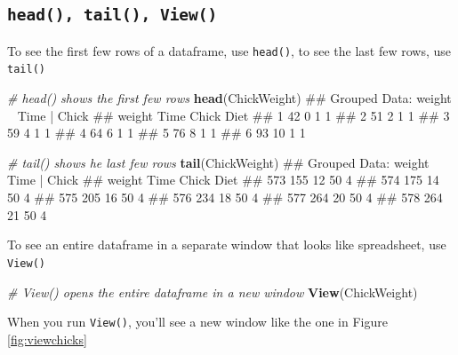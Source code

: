 \documentclass[]{book}
\newenvironment{Shaded}{\begin{snugshade}}{\end{snugshade}}
\newcommand{\KeywordTok}[1]{\textcolor[rgb]{0.13,0.29,0.53}{\textbf{#1}}}
\newcommand{\CommentTok}[1]{\textcolor[rgb]{0.56,0.35,0.01}{\textit{#1}}}
\newcommand{\NormalTok}[1]{#1}
\theoremstyle{definition}
\theoremstyle{definition}
\theoremstyle{remark}
\begin{document}
\subsection{\texorpdfstring{\texttt{head(),\ tail(),\ View()}}{head(), tail(), View()}}\label{head-tail-view}

To see the first few rows of a dataframe, use \texttt{head()}, to see
the last few rows, use \texttt{tail()}

\begin{Shaded}
\begin{Highlighting}[]
\CommentTok{# head() shows the first few rows}
\KeywordTok{head}\NormalTok{(ChickWeight)}
\NormalTok{## Grouped Data: weight ~ Time | Chick}
\NormalTok{##   weight Time Chick Diet}
\NormalTok{## 1     42    0     1    1}
\NormalTok{## 2     51    2     1    1}
\NormalTok{## 3     59    4     1    1}
\NormalTok{## 4     64    6     1    1}
\NormalTok{## 5     76    8     1    1}
\NormalTok{## 6     93   10     1    1}

\CommentTok{# tail() shows he last few rows}
\KeywordTok{tail}\NormalTok{(ChickWeight)}
\NormalTok{## Grouped Data: weight ~ Time | Chick}
\NormalTok{##     weight Time Chick Diet}
\NormalTok{## 573    155   12    50    4}
\NormalTok{## 574    175   14    50    4}
\NormalTok{## 575    205   16    50    4}
\NormalTok{## 576    234   18    50    4}
\NormalTok{## 577    264   20    50    4}
\NormalTok{## 578    264   21    50    4}
\end{Highlighting}
\end{Shaded}

To see an entire dataframe in a separate window that looks like
spreadsheet, use \texttt{View()}

\begin{Shaded}
\begin{Highlighting}[]
\CommentTok{# View() opens the entire dataframe in a new window}
\KeywordTok{View}\NormalTok{(ChickWeight)}
\end{Highlighting}
\end{Shaded}

When you run \texttt{View()}, you'll see a new window like the one in
Figure \ref{fig:viewchicks}
\end{document}
